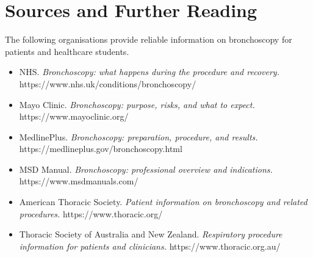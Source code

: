 \section*{Sources and Further Reading}
The following organisations provide reliable information on bronchoscopy for patients and healthcare students.

\begin{itemize}
    \item NHS. \textit{Bronchoscopy: what happens during the procedure and recovery.} https://www.nhs.uk/conditions/bronchoscopy/
    \item Mayo Clinic. \textit{Bronchoscopy: purpose, risks, and what to expect.} https://www.mayoclinic.org/
    \item MedlinePlus. \textit{Bronchoscopy: preparation, procedure, and results.} https://medlineplus.gov/bronchoscopy.html
    \item MSD Manual. \textit{Bronchoscopy: professional overview and indications.} https://www.msdmanuals.com/
    \item American Thoracic Society. \textit{Patient information on bronchoscopy and related procedures.} https://www.thoracic.org/
    \item Thoracic Society of Australia and New Zealand. \textit{Respiratory procedure information for patients and clinicians.} https://www.thoracic.org.au/
\end{itemize}
